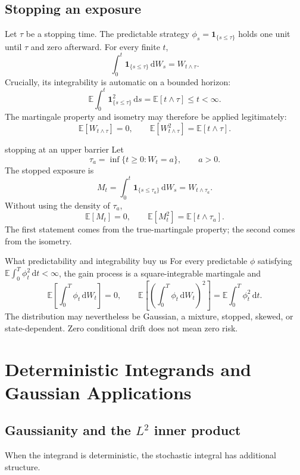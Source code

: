 \documentclass[10pt]{article}
\newcommand{\E}{\mathbb E}
\newcommand{\1}{\mathbf 1}
\newcommand{\dd}{\,\mathrm d}
\theoremstyle{definition}
\begin{document}
\subsection{Stopping an exposure}

Let \(\tau\) be a stopping time. The predictable strategy
\(\phi_s=\1_{\{s\leq\tau\}}\) holds one unit until \(\tau\) and zero afterward.
For every finite \(t\),
\[
\boxed{
\int_0^t\1_{\{s\leq\tau\}}\dd W_s=W_{t\wedge\tau}.}
\]
Crucially, its integrability is automatic on a bounded horizon:
\[
\E\int_0^t\1_{\{s\leq\tau\}}^2\dd s
=\E[t\wedge\tau]\leq t<\infty.
\]
The martingale property and isometry may therefore be applied legitimately:
\[
\boxed{
\E[W_{t\wedge\tau}]=0,
\qquad
\E[W_{t\wedge\tau}^2]=\E[t\wedge\tau].}
\]

\begin{boardexample}{stopping at an upper barrier}
Let
\[
\tau_a=\inf\{t\geq0:W_t=a\},
\qquad a>0.
\]
The stopped exposure is
\[
M_t=\int_0^t\1_{\{s\leq\tau_a\}}\dd W_s
=W_{t\wedge\tau_a}.
\]
Without using the density of \(\tau_a\),
\[
\E[M_t]=0,
\qquad
\E[M_t^2]=\E[t\wedge\tau_a].
\]
The first statement comes from the true-martingale property; the second comes
from the isometry.
\end{boardexample}

\begin{keyidea}{What predictability and integrability buy us}
For every predictable \(\phi\) satisfying
\(\E\int_0^T\phi_t^2\dd t<\infty\), the gain process is a
square-integrable martingale and
\[
\E\left[\int_0^T\phi_t\dd W_t\right]=0,
\qquad
\E\left[\left(\int_0^T\phi_t\dd W_t\right)^2\right]
=\E\int_0^T\phi_t^2\dd t.
\]
The distribution may nevertheless be Gaussian, a mixture, stopped, skewed, or
state-dependent. Zero conditional drift does not mean zero risk.
\end{keyidea}

\section{Deterministic Integrands and Gaussian Applications}

\subsection{Gaussianity and the \texorpdfstring{\(L^2\)}{L2} inner product}

When the integrand is deterministic, the stochastic integral has additional
structure.
\end{document}

